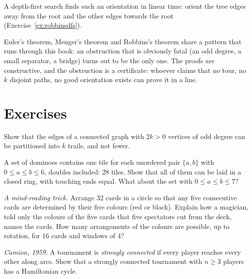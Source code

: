 A depth-first search finds such an orientation in linear time: orient the tree edges away from the root and the other edges
towards the root (Exercise~\ref{ex:robbinsdfs}).

\begin{beauty}
Euler's theorem, Menger's theorem and Robbins's theorem share a pattern that runs through this book: an obstruction that is
obviously fatal (an odd degree, a small separator, a bridge) turns out to be the only one. The proofs are constructive, and the
obstruction is a certificate: whoever claims that no tour, no $k$ disjoint paths, no good orientation exists can prove it in a line.
\end{beauty}

\section{Exercises}

\begin{exercise}[$\star$]\label{ex:trails}
Show that the edges of a connected graph with $2k>0$ vertices of odd degree can be partitioned into $k$ trails, and not fewer.
\end{exercise}

\begin{exercise}[$\star$]\label{ex:dominoes}
A set of dominoes contains one tile for each unordered pair $\{a,b\}$ with $0\le a\le b\le6$, doubles included: $28$ tiles. Show that all of them can
be laid in a closed ring, with touching ends equal. What about the set with $0\le a\le b\le7$?
\end{exercise}

\begin{exercise}[$\star$]\label{ex:cardtrick}
\emph{A mind-reading trick.} Arrange $32$ cards in a circle so that any five consecutive cards are determined by their five colours
(red or black). Explain how a magician, told only the colours of the five cards that five spectators cut from the deck,
names the cards. How many arrangements of the colours are possible, up to rotation, for $16$ cards and windows of $4$?
\end{exercise}

\begin{exercise}[$\star\star$]\label{ex:camion}
\emph{Camion, 1959.} A tournament is \emph{strongly connected} if every player reaches every other along arcs. Show that a strongly
connected tournament with $n\ge3$ players has a Hamiltonian cycle.
\end{exercise}

